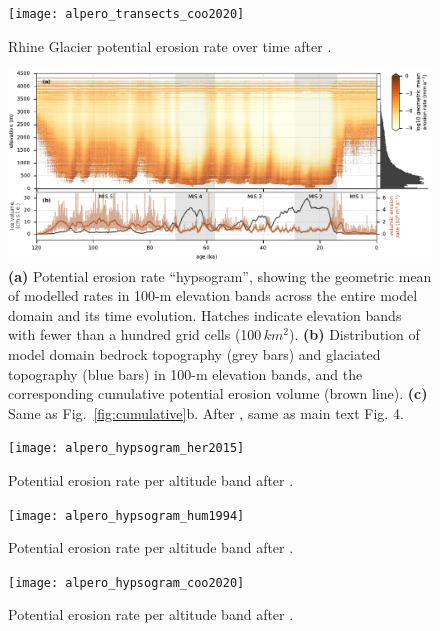 \documentclass[esurf]{copernicus}
\begin{document}
    \begin{figure}
      \texttt{[image: alpero\_transects\_coo2020]}
      \caption{%
        Rhine Glacier potential erosion rate over time after
        \citet{Cook.etal.2020}.}
    \end{figure}

    \begin{figure}
      \centerline{\includegraphics{alpero_hypsogram}}
      \caption[
        Potential erosion rate per altitude band after
        \citet{Koppes.etal.2015}, same as main text Fig. 4.
      ]{%
        \textbf{(a)} Potential erosion rate ``hypsogram'', showing the
          geometric mean of modelled rates in 100-m elevation bands
          across the entire model domain and its time evolution. Hatches
          indicate elevation bands with fewer than a hundred grid cells
          (100\,$km^2$).
        \textbf{(b)} Distribution of model domain bedrock topography (grey
          bars) and glaciated topography (blue bars) in 100-m elevation bands,
          and the corresponding cumulative potential erosion volume (brown
          line).
        \textbf{(c)} Same as Fig.~\ref{fig:cumulative}b.
        After \citet{Koppes.etal.2015}, same as main text Fig. 4.}
    \end{figure}

    \begin{figure}
      \texttt{[image: alpero\_hypsogram\_her2015]}
      \caption{%
        Potential erosion rate per altitude band after
        \citet{Herman.etal.2015}.}
    \end{figure}

    \begin{figure}
      \texttt{[image: alpero\_hypsogram\_hum1994]}
      \caption{%
        Potential erosion rate per altitude band after
        \citet{Humphrey.Raymond.1994}.}
    \end{figure}

    \begin{figure}
      \texttt{[image: alpero\_hypsogram\_coo2020]}
      \caption{%
        Potential erosion rate per altitude band after
        \citet{Cook.etal.2020}.}
    \end{figure}
\end{document}

